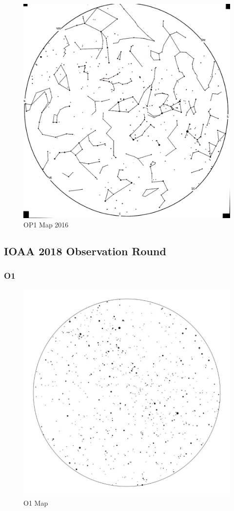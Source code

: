 \documentclass[a4paper,12pt]{extarticle}
\begin{document}
\begin{figure}[H]
    \centering
    \includegraphics[width=0.9\linewidth]{IOAA16_OM2.jpg}
    \caption{OP1 Map 2016}
\end{figure}

\subsection{IOAA 2018 Observation Round}
\subsubsection{O1}
\begin{figure}[H]
    \centering
    \includegraphics[width=\linewidth]{18_O1.jpg}
    \caption{O1 Map}
    \label{A2018_O1}
\end{figure}
\end{document}
